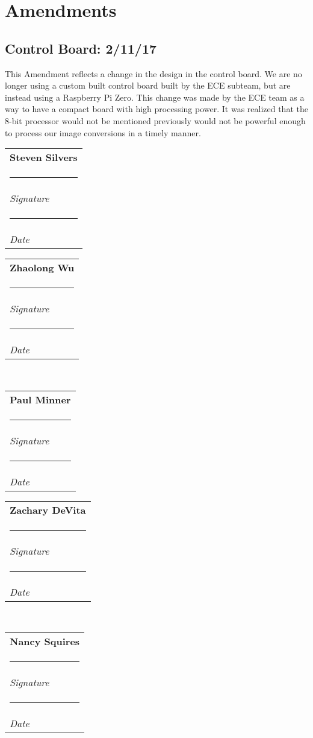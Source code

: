 \documentclass[10pt,letterpaper,onecolumn,journal]{IEEEtran}
\makeatletter
\newcommand{\namesigdate}[2][6cm]{%
\begin{tabular}{@{}p{#1}@{}}
	#2 \\[3\normalbaselineskip] \hrule \\[0pt]
	{\small \textit{Signature}} 
	\\[2\normalbaselineskip] \hrule \\[0pt]
	{\small \textit{Date}}
\end{tabular}
}
\makeatother
\begin{document}
\section{Amendments}
\subsection{Control Board: 2/11/17}
\par
This Amendment reflects a change in the design in the control board. We are no longer using a custom built control board built by the ECE subteam, but are instead using a Raspberry Pi Zero. This change was made by the ECE team as a way to have a compact board with high processing power. It was realized that the 8-bit processor would not be mentioned previously would not be powerful enough to process our image conversions in a timely manner.

\clearpage
{}



\clearpage
\vspace{1in}
\noindent \namesigdate{\textbf{Steven Silvers}}
\hfill
\vspace{1in}
\noindent \namesigdate{\textbf{Zhaolong Wu}}
\\
\vspace{1in}
\noindent \namesigdate{\textbf{Paul Minner}}
\hfill
\vspace{1in}
\noindent \namesigdate{\textbf{Zachary DeVita}}
\\
\noindent \namesigdate{\textbf{Nancy Squires}}
\end{document}
